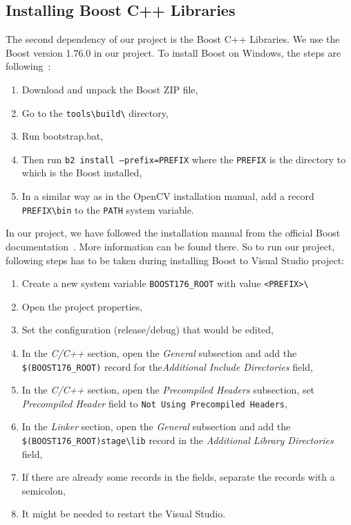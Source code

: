 \documentclass[thesis=B,english]{FITthesis}[2019/12/23]
\begin{document}
            \subsection{Installing Boost C++ Libraries}
                The second dependency of our project is the Boost C++ Libraries. We use the Boost version 1.76.0 in our project. To install Boost on Windows, the steps are following~\cite{BoostInstallWindows}:
                \begin{enumerate}
                    \item Download and unpack the Boost ZIP file,
                    \item Go to the \texttt{tools\textbackslash build\textbackslash} directory,
                    \item Run bootstrap.bat,
                    \item Then run \texttt{b2 install --prefix=PREFIX} where the \texttt{PREFIX} is the directory to which is the Boost installed,
                    \item In a similar way as in the OpenCV installation manual, add a record \texttt{PREFIX\textbackslash bin} to the \texttt{PATH} system variable.
                \end{enumerate}
                In our project, we have followed the installation manual from the official Boost documentation~\cite{BoostInstallWindows}. More information can be found there. So to run our project, following steps has to be taken during installing Boost to Visual Studio project:
                \begin{enumerate}
                    \item Create a new system variable \texttt{BOOST176\_ROOT} with value \texttt{<PREFIX>\textbackslash}
                    \item Open the project properties,
                    \item Set the configuration (release/debug) that would be edited,
                    \item In the \textit{C/C++} section, open the \textit{General} subsection and add the\\ \texttt{\$(BOOST176\_ROOT)} record for the\textit{Additional Include Directories} field,
                    \item In the \textit{C/C++} section, open the \textit{Precompiled Headers} subsection, set \textit{Precompiled Header} field to \texttt{Not Using Precompiled Headers},
                    \item In the \textit{Linker} section, open the \textit{General} subsection and add the\\ \texttt{\$(BOOST176\_ROOT)stage\textbackslash lib} record in the \textit{Additional Library Directories} field,
                    \item If there are already some records in the fields, separate the records with a semicolon,
                    \item It might be needed to restart the Visual Studio.
                \end{enumerate}
\end{document}
